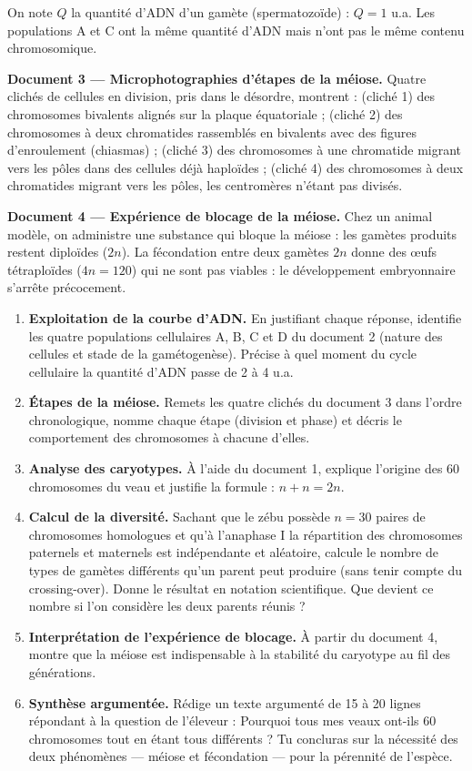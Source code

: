 \documentclass[11pt]{article}
\newcounter{popsec}
\newcounter{popsub}
\newcommand{\courssub}[1]{%
  \stepcounter{popsub}%
  \par\vspace{9pt}\noindent{\popxbold\fontsize{11.5}{13}\selectfont\color{popink}{\color{poporange}\thepopsec.\thepopsub}\hspace{6pt}#1}\par\nopagebreak\vspace{4pt}
}
\begin{document}
On note $Q$ la quantité d'ADN d'un gamète (spermatozoïde) : $Q = 1$ u.a. Les populations A et C ont la même quantité d'ADN mais n'ont pas le même contenu chromosomique.

\medskip
\textbf{Document 3 — Microphotographies d'étapes de la méiose.} Quatre clichés de cellules en division, pris dans le désordre, montrent : (cliché 1) des chromosomes bivalents alignés sur la plaque équatoriale ; (cliché 2) des chromosomes à deux chromatides rassemblés en bivalents avec des figures d'enroulement (chiasmas) ; (cliché 3) des chromosomes à une chromatide migrant vers les pôles dans des cellules déjà haploïdes ; (cliché 4) des chromosomes à deux chromatides migrant vers les pôles, les centromères n'étant pas divisés.

\medskip
\textbf{Document 4 — Expérience de blocage de la méiose.} Chez un animal modèle, on administre une substance qui bloque la méiose : les gamètes produits restent diploïdes ($2n$). La fécondation entre deux gamètes $2n$ donne des œufs tétraploïdes ($4n = 120$) qui ne sont pas viables : le développement embryonnaire s'arrête précocement.

\courssub{Consignes}

\begin{enumerate}
\item \textbf{Exploitation de la courbe d'ADN.} En justifiant chaque réponse, identifie les quatre populations cellulaires A, B, C et D du document 2 (nature des cellules et stade de la gamétogenèse). Précise à quel moment du cycle cellulaire la quantité d'ADN passe de 2 à 4 u.a.
\item \textbf{Étapes de la méiose.} Remets les quatre clichés du document 3 dans l'ordre chronologique, nomme chaque étape (division et phase) et décris le comportement des chromosomes à chacune d'elles.
\item \textbf{Analyse des caryotypes.} À l'aide du document 1, explique l'origine des 60 chromosomes du veau et justifie la formule : $n + n = 2n$.
\item \textbf{Calcul de la diversité.} Sachant que le zébu possède $n = 30$ paires de chromosomes homologues et qu'à l'anaphase I la répartition des chromosomes paternels et maternels est indépendante et aléatoire, calcule le nombre de types de gamètes différents qu'un parent peut produire (sans tenir compte du crossing-over). Donne le résultat en notation scientifique. Que devient ce nombre si l'on considère les deux parents réunis ?
\item \textbf{Interprétation de l'expérience de blocage.} À partir du document 4, montre que la méiose est indispensable à la stabilité du caryotype au fil des générations.
\item \textbf{Synthèse argumentée.} Rédige un texte argumenté de 15 à 20 lignes répondant à la question de l'éleveur : \og Pourquoi tous mes veaux ont-ils 60 chromosomes tout en étant tous différents ? \fg{} Tu concluras sur la nécessité des deux phénomènes — méiose et fécondation — pour la pérennité de l'espèce.
\end{enumerate}
\end{document}
